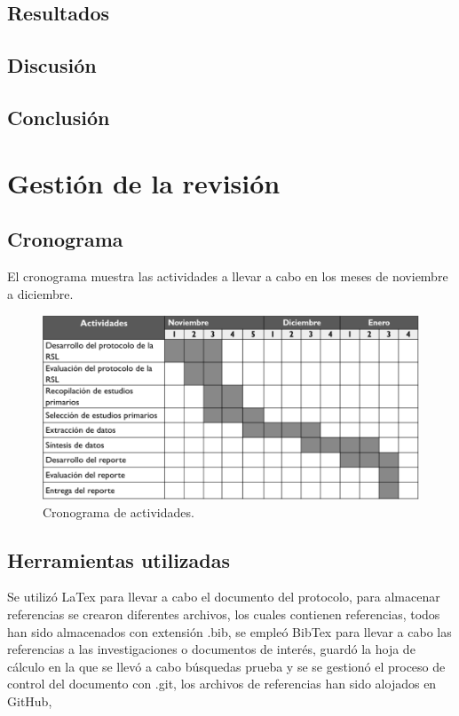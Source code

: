 \documentclass{article}
\begin{document}
\subsection{Resultados}
\subsection{Discusión}
\subsection{Conclusión}
\newpage

\section{Gestión de la revisión}

\subsection{Cronograma}
El cronograma muestra las actividades a llevar a cabo en los meses de noviembre a diciembre.

\begin{figure}[!htb]
    \includegraphics[width=\linewidth]{gant.png}
    \caption{Cronograma de actividades.}
    \label{fig:grant}
\end{figure}

\subsection{Herramientas utilizadas}
Se utilizó LaTex para llevar a cabo el documento del protocolo, para almacenar referencias 
se crearon diferentes archivos, los cuales contienen referencias, todos han sido 
almacenados con extensión .bib, se empleó BibTex para llevar a cabo las referencias a las 
investigaciones o documentos de interés, guardó la hoja de cálculo en la que se llevó 
a cabo búsquedas prueba y se se gestionó el proceso de control del documento con .git,
los archivos de referencias han sido alojados en GitHub,
\newpage
\end{document}
